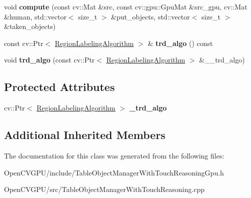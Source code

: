 \begin{DoxyCompactItemize}
void {\bfseries compute} (const cv\+::\+Mat \&src, const cv\+::gpu\+::\+Gpu\+Mat \&src\+\_\+gpu, cv\+::\+Mat \&human, std\+::vector$<$ size\+\_\+t $>$ \&put\+\_\+objects, std\+::vector$<$ size\+\_\+t $>$ \&taken\+\_\+objects)
\item 
\hypertarget{classskl_1_1gpu_1_1_table_object_manager_with_touch_reasoning_a406479505414e1ccb9f024d44a423202}{}\label{classskl_1_1gpu_1_1_table_object_manager_with_touch_reasoning_a406479505414e1ccb9f024d44a423202} 
const cv\+::\+Ptr$<$ \hyperlink{classskl_1_1_filter_mat2_mat}{Region\+Labeling\+Algorithm} $>$ \& {\bfseries trd\+\_\+algo} () const
\item 
\hypertarget{classskl_1_1gpu_1_1_table_object_manager_with_touch_reasoning_a829aa1a1edead8c607e176be17c5bbb4}{}\label{classskl_1_1gpu_1_1_table_object_manager_with_touch_reasoning_a829aa1a1edead8c607e176be17c5bbb4} 
void {\bfseries trd\+\_\+algo} (const cv\+::\+Ptr$<$ \hyperlink{classskl_1_1_filter_mat2_mat}{Region\+Labeling\+Algorithm} $>$ \&\+\_\+\+\_\+trd\+\_\+algo)
\end{DoxyCompactItemize}
\subsection*{Protected Attributes}
\begin{DoxyCompactItemize}
\item 
\hypertarget{classskl_1_1gpu_1_1_table_object_manager_with_touch_reasoning_ac2d437b86cd319442b00727cdc74ab49}{}\label{classskl_1_1gpu_1_1_table_object_manager_with_touch_reasoning_ac2d437b86cd319442b00727cdc74ab49} 
cv\+::\+Ptr$<$ \hyperlink{classskl_1_1_filter_mat2_mat}{Region\+Labeling\+Algorithm} $>$ {\bfseries \+\_\+trd\+\_\+algo}
\end{DoxyCompactItemize}
\subsection*{Additional Inherited Members}


The documentation for this class was generated from the following files\+:\begin{DoxyCompactItemize}
\item 
Open\+C\+V\+G\+P\+U/include/Table\+Object\+Manager\+With\+Touch\+Reasoning\+Gpu.\+h\item 
Open\+C\+V\+G\+P\+U/src/Table\+Object\+Manager\+With\+Touch\+Reasoning.\+cpp\end{DoxyCompactItemize}
